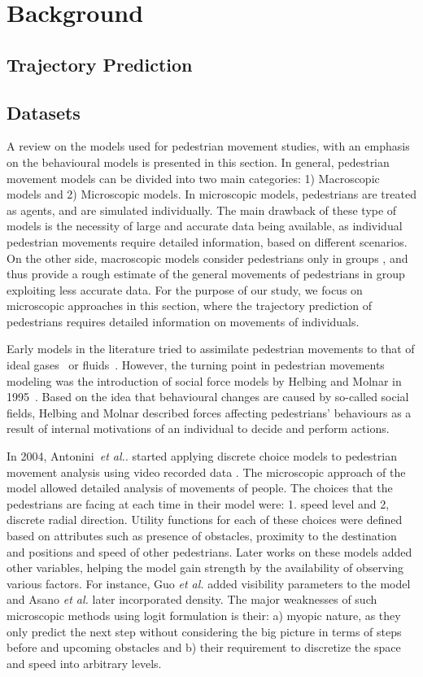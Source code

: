 \section{Background}
\label{S:TBack}
\subsection{Trajectory Prediction}
\subsection{Datasets}
A review on the models used for pedestrian movement studies, with an emphasis on the behavioural models is presented in this section. In general, pedestrian movement models can be divided into two main categories: 1) Macroscopic models and 2) Microscopic models. In microscopic models, pedestrians are treated as agents, and are simulated individually. The main drawback of these type of models is the necessity of large and accurate data being available, as individual pedestrian movements require detailed information, based on different scenarios. On the other side, macroscopic models consider pedestrians only in groups \citep{sahaleh2012scenario}, and thus provide a rough estimate of the general movements of pedestrians in group exploiting less accurate data. For the purpose of our study, we focus on microscopic approaches in this section, where the trajectory prediction of pedestrians requires detailed information on movements of individuals.

Early models in the literature tried to assimilate pedestrian movements to that of ideal gases~\citep{henderson1974fluid} or fluids~\citep{helbing1998fluid}. However, the turning point in pedestrian movements modeling was the introduction of social force models by Helbing and Molnar in 1995~\citep{helbing1995social}. Based on the idea that behavioural changes are caused by so-called social fields, Helbing and Molnar described forces affecting pedestrians’ behaviours as a result of internal motivations of an individual to decide and perform actions.

In 2004, Antonini~\textit{et al.}. started applying discrete choice models to pedestrian movement analysis using video recorded data \citep{antonini2004simulation}. The microscopic approach of the model allowed detailed analysis of movements of people. The choices that the pedestrians are facing at each time in their model were: 1. speed level and 2, discrete radial direction. Utility functions for each of these choices were defined based on attributes such as presence of obstacles, proximity to the destination and positions and speed of other pedestrians. Later works on these models added other variables, helping the model gain strength by the availability of observing various factors. For instance, Guo \textit{et al.} \citep{guo2012route} added visibility parameters to the model and Asano \textit{et al.} \citep{asano2010microscopic} later incorporated density. The major weaknesses of such microscopic methods using logit formulation is their: a) myopic nature, as they only predict the next step without considering the big picture in terms of steps before and upcoming obstacles and b) their requirement to discretize the space and speed into arbitrary levels.

